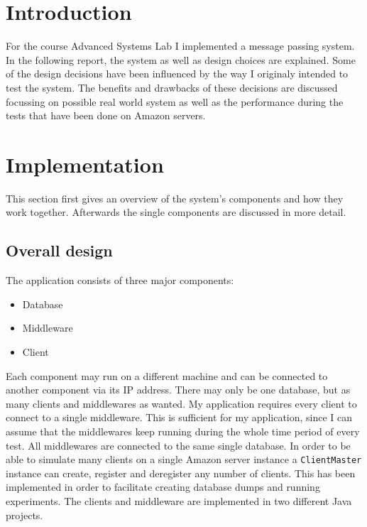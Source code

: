 \documentclass[
10pt, %
a4paper, %
oneside, %
headinclude,footinclude, %
BCOR5mm, %
]{scrartcl}
\begin{document}
\section{Introduction}
For the course Advanced Systems Lab I implemented a message passing system. In the following report, the system as well as design choices are explained. Some of the design decisions have been influenced by the way I originaly intended to test the system. The benefits and drawbacks of these decisions are discussed focussing on possible real world system as well as the performance during the tests that have been done on Amazon servers.



\section{Implementation}
This section first gives an overview of the system's components and how they work together. Afterwards the single components are discussed in more detail. 

\subsection{Overall design}
The application consists of three major components:
\begin{itemize}
	\item Database
	\item Middleware
	\item Client
\end{itemize}

Each component may run on a different machine and can be connected to another component via its IP address. There may only be one database, but as many clients and middlewares as wanted. My application requires every client to connect to a single middleware. This is sufficient for my application, since I can assume that the middlewares keep running during the whole time period of every test. All middlewares are connected to the same single database. In order to be able to simulate many clients on a single Amazon server instance a \texttt{ClientMaster} instance can create, register and deregister any number of clients. This has been implemented in order to facilitate creating database dumps and running experiments. The clients and middleware are implemented in two different Java projects. 
\end{document}
